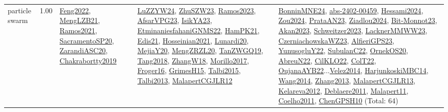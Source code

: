 {\begin{longtable}{p{3cm}r>{\raggedright\arraybackslash}p{6cm}>{\raggedright\arraybackslash}p{6cm}>{\raggedright\arraybackslash}p{8cm}}
\index{particle swarm}\index{Algorithms!particle swarm}particle swarm &  1.00 & \hyperref[detail:Feng2022]{Feng2022}, \hyperref[detail:MengLZB21]{MengLZB21}, \hyperref[detail:Ramos2021]{Ramos2021}, \hyperref[detail:SacramentoSP20]{SacramentoSP20}, \hyperref[detail:ZarandiASC20]{ZarandiASC20}, \hyperref[detail:Chakrabortty2019]{Chakrabortty2019} & \hyperref[detail:LuZZYW24]{LuZZYW24}, \hyperref[detail:ZhuSZW23]{ZhuSZW23}, \hyperref[detail:Ramos2023]{Ramos2023}, \hyperref[detail:AfsarVPG23]{AfsarVPG23}, \hyperref[detail:IsikYA23]{IsikYA23}, \hyperref[detail:EtminaniesfahaniGNMS22]{EtminaniesfahaniGNMS22}, \hyperref[detail:HamPK21]{HamPK21}, \hyperref[detail:Edis21]{Edis21}, \hyperref[detail:Hosseinian2021]{Hosseinian2021}, \hyperref[detail:Lunardi20]{Lunardi20}, \hyperref[detail:MejiaY20]{MejiaY20}, \hyperref[detail:MengZRZL20]{MengZRZL20}, \hyperref[detail:TanZWGQ19]{TanZWGQ19}, \hyperref[detail:Tang2018]{Tang2018}, \hyperref[detail:ZhangW18]{ZhangW18}, \hyperref[detail:Morillo2017]{Morillo2017}, \hyperref[detail:Froger16]{Froger16}, \hyperref[detail:GrimesH15]{GrimesH15}, \hyperref[detail:Talbi2015]{Talbi2015}, \hyperref[detail:Talbi2013]{Talbi2013}, \hyperref[detail:MalapertCGJLR12]{MalapertCGJLR12} & \hyperref[detail:BonninMNE24]{BonninMNE24}, \hyperref[detail:abs-2402-00459]{abs-2402-00459}, \hyperref[detail:Hessami2024]{Hessami2024}, \hyperref[detail:Zou2024]{Zou2024}, \hyperref[detail:PrataAN23]{PrataAN23}, \hyperref[detail:Ziadlou2024]{Ziadlou2024}, \hyperref[detail:Bit-Monnot23]{Bit-Monnot23}, \hyperref[detail:Akan2023]{Akan2023}, \hyperref[detail:Schweitzer2023]{Schweitzer2023}, \hyperref[detail:LacknerMMWW23]{LacknerMMWW23}, \hyperref[detail:CzerniachowskaWZ23]{CzerniachowskaWZ23}, \hyperref[detail:AlfieriGPS23]{AlfieriGPS23}, \hyperref[detail:YunusogluY22]{YunusogluY22}, \hyperref[detail:SubulanC22]{SubulanC22}, \hyperref[detail:OrnekOS20]{OrnekOS20}, \hyperref[detail:AbreuN22]{AbreuN22}, \hyperref[detail:CilKLO22]{CilKLO22}, \hyperref[detail:ColT22]{ColT22}, \hyperref[detail:OujanaAYB22]{OujanaAYB22}...\hyperref[detail:Velez2014]{Velez2014}, \hyperref[detail:HarjunkoskiMBC14]{HarjunkoskiMBC14}, \hyperref[detail:Wang2014]{Wang2014}, \hyperref[detail:Zhang2013]{Zhang2013}, \hyperref[detail:MalapertCGJLR13]{MalapertCGJLR13}, \hyperref[detail:Kelareva2012]{Kelareva2012}, \hyperref[detail:Deblaere2011]{Deblaere2011}, \hyperref[detail:Malapert11]{Malapert11}, \hyperref[detail:Coelho2011]{Coelho2011}, \hyperref[detail:ChenGPSH10]{ChenGPSH10} (Total: 64)\\

\end{longtable}}
